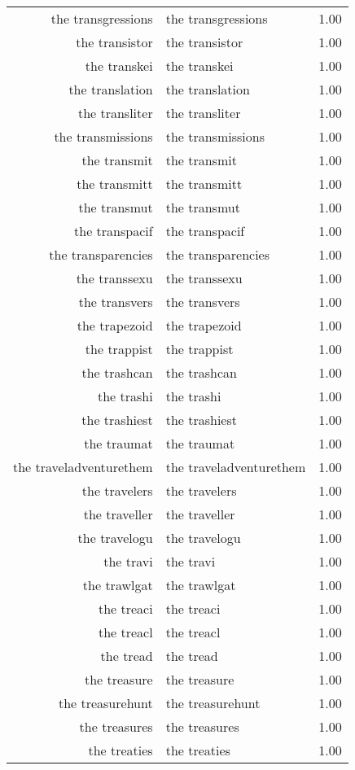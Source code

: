 \begin{table}[ht]
\begin{tabular}{rlr}
  the transgressions & the transgressions & 1.00 \\ 
  the transistor & the transistor & 1.00 \\ 
  the transkei & the transkei & 1.00 \\ 
  the translation & the translation & 1.00 \\ 
  the transliter & the transliter & 1.00 \\ 
  the transmissions & the transmissions & 1.00 \\ 
  the transmit & the transmit & 1.00 \\ 
  the transmitt & the transmitt & 1.00 \\ 
  the transmut & the transmut & 1.00 \\ 
  the transpacif & the transpacif & 1.00 \\ 
  the transparencies & the transparencies & 1.00 \\ 
  the transsexu & the transsexu & 1.00 \\ 
  the transvers & the transvers & 1.00 \\ 
  the trapezoid & the trapezoid & 1.00 \\ 
  the trappist & the trappist & 1.00 \\ 
  the trashcan & the trashcan & 1.00 \\ 
  the trashi & the trashi & 1.00 \\ 
  the trashiest & the trashiest & 1.00 \\ 
  the traumat & the traumat & 1.00 \\ 
  the traveladventurethem & the traveladventurethem & 1.00 \\ 
  the travelers & the travelers & 1.00 \\ 
  the traveller & the traveller & 1.00 \\ 
  the travelogu & the travelogu & 1.00 \\ 
  the travi & the travi & 1.00 \\ 
  the trawlgat & the trawlgat & 1.00 \\ 
  the treaci & the treaci & 1.00 \\ 
  the treacl & the treacl & 1.00 \\ 
  the tread & the tread & 1.00 \\ 
  the treasure & the treasure & 1.00 \\ 
  the treasurehunt & the treasurehunt & 1.00 \\ 
  the treasures & the treasures & 1.00 \\ 
  the treaties & the treaties & 1.00 \\ 

\end{tabular}
\end{table}
